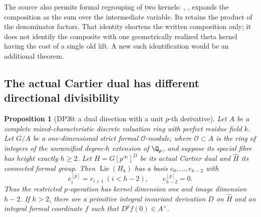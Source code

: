 \documentclass[11pt,a4paper]{article}
\newtheorem{proposition}[theorem]{Proposition}
\theoremstyle{definition}\newtheorem{remark}[theorem]{Remark}
\newcommand{\Lie}{\operatorname{Lie}}\newcommand{\Dist}{\operatorname{Dist}}
\begin{document}
The source also permits formal regrouping of two kernels: , , expands the composition as the sum over the intermediate variable. Its  retains the product of the denominator factors. That identity shortens the written composition only; it does not identify the composite with one geometrically realized theta kernel having the cost of a single old lift. A new such identification would be an additional theorem.

\subsection{The actual Cartier dual has different directional divisibility}

\begin{proposition}[DP30: a dual direction with a unit $p$-th derivative]\label{DP30}
Let $A$ be a complete mixed-characteristic discrete valuation ring with perfect residue field $k$. Let $G/A$ be a one-dimensional strict formal $\mathcal O$-module, where $\mathcal O\subset A$ is the ring of integers of the unramified degree-$h$ extension of $\Q_p$, and suppose its special fibre has height exactly $h\ge2$. Let $H=G[p^\infty]^D$ be its actual Cartier dual and $\widehat H$ its connected formal group. Then $\Lie(H_k)$ has a basis $e_0,\ldots,e_{h-2}$ with
\[
 e_i^{[p]}=e_{i+1}\ (i<h-2),\qquad e_{h-2}^{[p]}=0.
\]
Thus the restricted $p$-operation has kernel dimension one and image dimension $h-2$. If $h>2$, there are a primitive integral invariant derivation $D$ on $\widehat H$ and an integral formal coordinate $f$ such that $D^pf(0)\in A^\times$.
\end{proposition}
\end{document}
